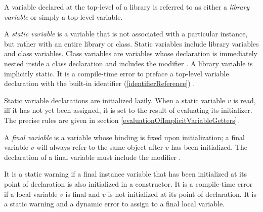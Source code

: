 \documentclass{article}
\begin{document}
\LMHash{}
A variable declared at the top-level of a library is referred to as either a {\em library variable} or simply a top-level variable.

\LMHash{}
A {\em static variable} is a variable that is not associated with a particular instance, but rather with an entire library or class.
Static variables include library variables and class variables.
Class variables are variables whose declaration is immediately nested inside a class declaration and includes the modifier \STATIC{}.
A library variable is implicitly static.
It is a compile-time error to preface a top-level variable declaration with the built-in identifier (\ref{identifierReference}) \STATIC{}.

\LMHash{}
Static variable declarations are initialized lazily.
When a static variable $v$ is read, if{}f it has not yet been assigned, it is set to the result of evaluating its initializer.
The precise rules are given in section \ref{evaluationOfImplicitVariableGetters}.


\LMHash{}
A {\em final variable} is a variable whose binding is fixed upon initialization; a final variable $v$ will always refer to the same object after $v$ has been initialized.
The declaration of a final variable must include the modifier \FINAL{}.

\LMHash{}
It is a static warning if a final instance variable that has been initialized at its point of declaration is also initialized in a constructor.
It is a compile-time error if a local variable $v$ is final and $v$ is not initialized at its point of declaration.
It is a static warning and a dynamic error to assign to a final local variable.

\end{document}
